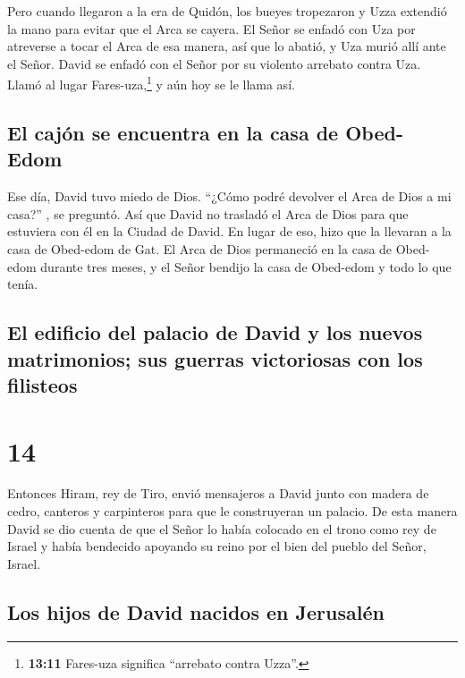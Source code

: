 Pero cuando llegaron a la era de Quidón, los bueyes
tropezaron y Uzza extendió la mano para evitar que el Arca se cayera.
 El Señor se enfadó con Uza por atreverse a tocar el Arca
de esa manera, así que lo abatió, y Uza murió allí ante el Señor.
 David se enfadó con el Señor por su violento arrebato
contra Uza. Llamó al lugar Fares-uza,\footnote{\textbf{13:11} Fares-uza
  significa ``arrebato contra Uzza''.} y aún hoy se le llama así.

\hypertarget{el-cajuxf3n-se-encuentra-en-la-casa-de-obed-edom}{%
\subsection{El cajón se encuentra en la casa de
Obed-Edom}\label{el-cajuxf3n-se-encuentra-en-la-casa-de-obed-edom}}

 Ese día, David tuvo miedo de Dios. ``¿Cómo podré
devolver el Arca de Dios a mi casa?'' , se preguntó.  Así
que David no trasladó el Arca de Dios para que estuviera con él en la
Ciudad de David. En lugar de eso, hizo que la llevaran a la casa de
Obed-edom de Gat.  El Arca de Dios permaneció en la casa
de Obed-edom durante tres meses, y el Señor bendijo la casa de Obed-edom
y todo lo que tenía.

\hypertarget{el-edificio-del-palacio-de-david-y-los-nuevos-matrimonios-sus-guerras-victoriosas-con-los-filisteos}{%
\subsection{El edificio del palacio de David y los nuevos matrimonios;
sus guerras victoriosas con los
filisteos}\label{el-edificio-del-palacio-de-david-y-los-nuevos-matrimonios-sus-guerras-victoriosas-con-los-filisteos}}

\hypertarget{section-13}{%
\section{14}\label{section-13}}

 Entonces Hiram, rey de Tiro, envió mensajeros a David
junto con madera de cedro, canteros y carpinteros para que le
construyeran un palacio.  De esta manera David se dio
cuenta de que el Señor lo había colocado en el trono como rey de Israel
y había bendecido apoyando su reino por el bien del pueblo del Señor,
Israel.

\hypertarget{los-hijos-de-david-nacidos-en-jerusaluxe9n}{%
\subsection{Los hijos de David nacidos en
Jerusalén}\label{los-hijos-de-david-nacidos-en-jerusaluxe9n}}

